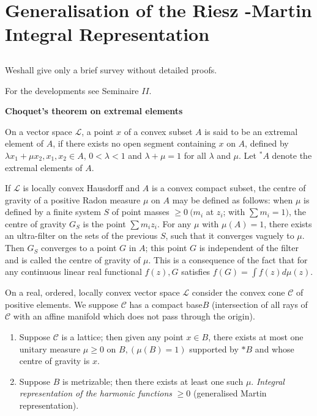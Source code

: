 \chapter{Generalisation of the Riesz -Martin Integral
  Representation}\label{p4:chap10}%

\setcounter{section}{40}
\section{}\label{p4:chap10:sec41}%

We\pageoriginale shall give only a brief survey without detailed proofs.

For the developments see \cite{1} Seminaire $II$.

\noindent
\textbf{Choquet's theorem on extremal elements}

On a vector space $\mathscr{L}$, a point $x$ of a convex subset $A$ is
said to be an extremal element of $A$, if there exists no open segment
containing $x$ on $A$, defined by $\lambda x_1 +  \mu x_2, x_1, x_2
\in A$, $0 < \lambda < 1$ and $\lambda + \mu = 1 $ for all $\lambda$
and $\mu$. Let ${}^*A$ denote the extremal elements of $A$. 

If $\mathscr{L}$ is locally convex Hausdorff and $A$ is a convex
compact subset, the centre of gravity of a positive Radon measure
$\mu$ on $A$ may be defined as follows: when $\mu$ is defined by a
finite system $S$ of point masses $\ge 0 ~ (m_i $ at $z_i$; with $\sum
m_i = 1)$, the centre of gravity $G_S$ is the point $\sum m_i
z_i$. For any $\mu$ with $\mu (A) = 1$, there exists an ultra-filter
on the sets of the previous $S$, such that it converges vaguely to
$\mu$. Then $G_S$ converges to a point $G$ in $A$; this point $G$ is
independent of the filter and is called the centre of gravity of
$\mu$. This is a consequence of the fact that for any continuous
linear real functional $f(z), G$ satisfies $f(G) = \int f(z) d \mu (z)$.

\begin{thm}[Choquet]\label{p4:chap10:sec41:thm34} %
  On a real, ordered, locally convex vector space $\mathscr{L}$ consider
  the convex cone $\mathscr{C}$ of positive elements. We suppose
  $\mathscr{C}$ has a compact base\pageoriginale $B$ (intersection of all rays of
  $\mathscr{C}$ with an affine manifold which does not pass through the
  origin). 
  \begin{enumerate} [\rm(i)]
  \item Suppose $\mathscr{C}$ is a lattice; then given any point $x \in
    B$, there exists at most one unitary measure $\mu \ge 0$ on $B, (\mu
    (B) = 1)$ supported by $*B$ and whose centre of gravity is $x$. 
  \item Suppose $B$ is metrizable; then there exists at least one such
    $\mu$. \textit{Integral representation of the harmonic functions}
    $\ge 0$ (generalised Martin representation). 
  \end{enumerate}
\end{thm}

